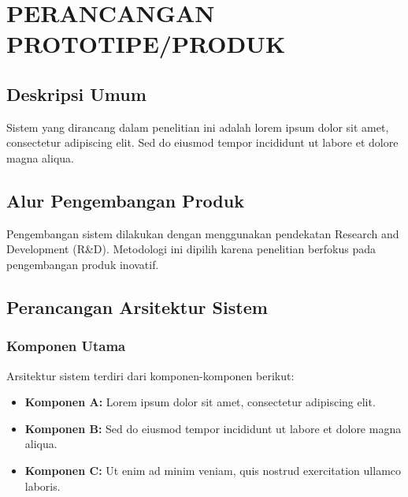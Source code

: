 \chapter{PERANCANGAN PROTOTIPE/PRODUK}

\section{Deskripsi Umum}


Sistem yang dirancang dalam penelitian ini adalah lorem ipsum dolor sit amet, consectetur adipiscing elit. Sed do eiusmod tempor incididunt ut labore et dolore magna aliqua.


\section{Alur Pengembangan Produk}


Pengembangan sistem dilakukan dengan menggunakan pendekatan Research and Development (R\&D). Metodologi ini dipilih karena penelitian berfokus pada pengembangan produk inovatif.

\section{Perancangan Arsitektur Sistem}

\subsection{Komponen Utama}


Arsitektur sistem terdiri dari komponen-komponen berikut:

\begin{itemize}
    \item \textbf{Komponen A:} Lorem ipsum dolor sit amet, consectetur adipiscing elit.
    \item \textbf{Komponen B:} Sed do eiusmod tempor incididunt ut labore et dolore magna aliqua.
    \item \textbf{Komponen C:} Ut enim ad minim veniam, quis nostrud exercitation ullamco laboris.
\end{itemize}

